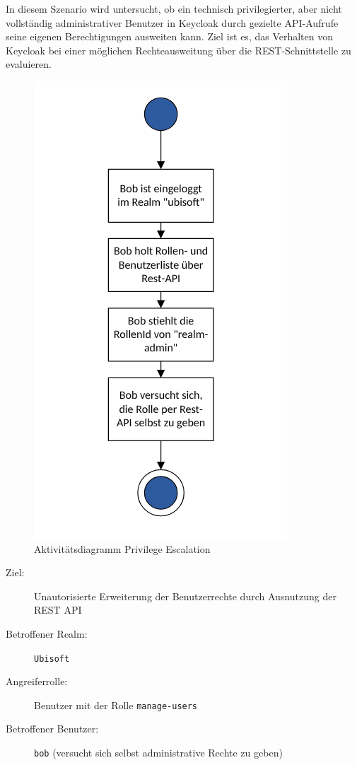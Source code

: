 \documentclass[a4paper,12pt]{article}
\begin{document}
	In diesem Szenario wird untersucht, ob ein technisch privilegierter, aber nicht vollständig administrativer Benutzer in Keycloak durch gezielte API-Aufrufe seine eigenen Berechtigungen ausweiten kann. Ziel ist es, das Verhalten von Keycloak bei einer möglichen Rechteausweitung über die REST-Schnittstelle zu evaluieren.
	
	\begin{figure}
		\centering
		\includegraphics[width=0.5\linewidth]{Bilder/priv_esc_ad}
		\caption{Aktivitätsdiagramm Privilege Escalation}
		\label{fig:privescad}
	\end{figure}
	
	
	\begin{description}
		\item[Ziel:] Unautorisierte Erweiterung der Benutzerrechte durch Ausnutzung der REST API
		\item[Betroffener Realm:] \texttt{Ubisoft}
		\item[Angreiferrolle:] Benutzer mit der Rolle \texttt{manage-users}
		\item[Betroffener Benutzer:] \texttt{bob} (versucht sich selbst administrative Rechte zu geben)
	\end{description}
	
\end{document}
